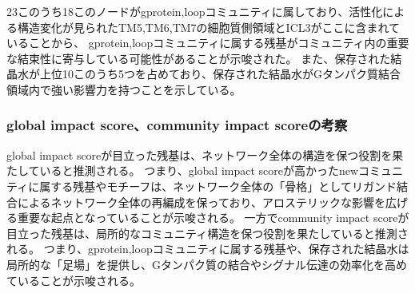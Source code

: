 \newpage

23このうち18このノードがgprotein,loopコミュニティに属しており、活性化による構造変化が見られたTM5,TM6,TM7の細胞質側領域とICL3がここに含まれていることから、
gprotein,loopコミュニティに属する残基がコミュニティ内の重要な結束性に寄与している可能性があることが示唆された。
また、保存された結晶水が上位10このうち5つを占めており、保存された結晶水がGタンパク質結合領域内で強い影響力を持つことを示している。


\subsubsection{global impact score、community impact scoreの考察}

global impact scoreが目立った残基は、ネットワーク全体の構造を保つ役割を果たしていると推測される。
つまり、global impact scoreが高かったnewコミュニティに属する残基やモチーフは、ネットワーク全体の「骨格」としてリガンド結合によるネットワーク全体の再編成を保っており、アロステリックな影響を広げる重要な起点となっていることが示唆される。
一方でcommunity impact scoreが目立った残基は、局所的なコミュニティ構造を保つ役割を果たしていると推測される。
つまり、gprotein,loopコミュニティに属する残基や、保存された結晶水は局所的な「足場」を提供し、Gタンパク質の結合やシグナル伝達の効率化を高めていることが示唆される。






